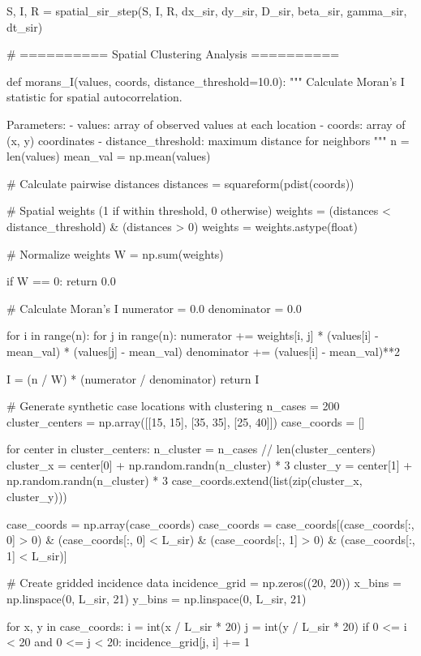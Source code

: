 \documentclass[a4paper, 11pt]{article}
\begin{document}
\begin{pycode}
    S, I, R = spatial_sir_step(S, I, R, dx_sir, dy_sir, D_sir, beta_sir, gamma_sir, dt_sir)

# ========== Spatial Clustering Analysis ==========

def morans_I(values, coords, distance_threshold=10.0):
    """
    Calculate Moran's I statistic for spatial autocorrelation.

    Parameters:
    - values: array of observed values at each location
    - coords: array of (x, y) coordinates
    - distance_threshold: maximum distance for neighbors
    """
    n = len(values)
    mean_val = np.mean(values)

    # Calculate pairwise distances
    distances = squareform(pdist(coords))

    # Spatial weights (1 if within threshold, 0 otherwise)
    weights = (distances < distance_threshold) & (distances > 0)
    weights = weights.astype(float)

    # Normalize weights
    W = np.sum(weights)

    if W == 0:
        return 0.0

    # Calculate Moran's I
    numerator = 0.0
    denominator = 0.0

    for i in range(n):
        for j in range(n):
            numerator += weights[i, j] * (values[i] - mean_val) * (values[j] - mean_val)
        denominator += (values[i] - mean_val)**2

    I = (n / W) * (numerator / denominator)
    return I

# Generate synthetic case locations with clustering
n_cases = 200
cluster_centers = np.array([[15, 15], [35, 35], [25, 40]])
case_coords = []

for center in cluster_centers:
    n_cluster = n_cases // len(cluster_centers)
    cluster_x = center[0] + np.random.randn(n_cluster) * 3
    cluster_y = center[1] + np.random.randn(n_cluster) * 3
    case_coords.extend(list(zip(cluster_x, cluster_y)))

case_coords = np.array(case_coords)
case_coords = case_coords[(case_coords[:, 0] > 0) & (case_coords[:, 0] < L_sir) &
                          (case_coords[:, 1] > 0) & (case_coords[:, 1] < L_sir)]

# Create gridded incidence data
incidence_grid = np.zeros((20, 20))
x_bins = np.linspace(0, L_sir, 21)
y_bins = np.linspace(0, L_sir, 21)

for x, y in case_coords:
    i = int(x / L_sir * 20)
    j = int(y / L_sir * 20)
    if 0 <= i < 20 and 0 <= j < 20:
        incidence_grid[j, i] += 1


\end{pycode}
\end{document}
